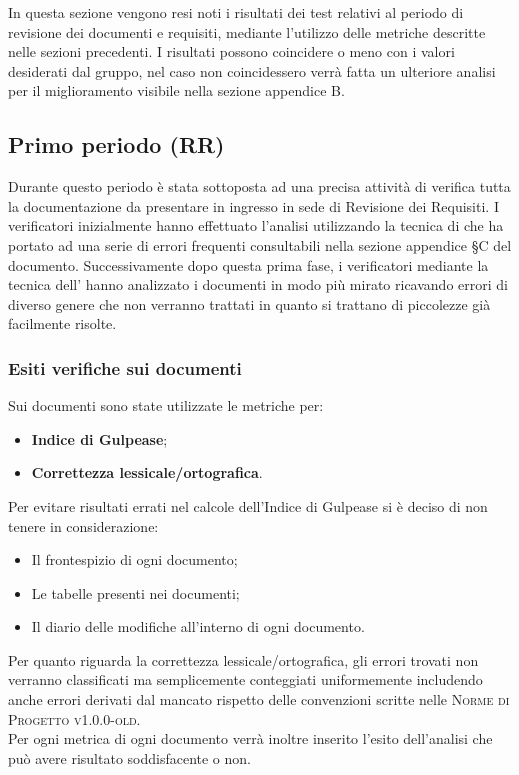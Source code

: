 \documentclass[../piano-di-qualifica.tex]{subfiles}
\begin{document}
In questa sezione vengono resi noti i risultati dei test relativi al periodo di revisione dei documenti e requisiti, mediante l'utilizzo delle metriche descritte nelle sezioni precedenti.
I risultati possono coincidere o meno con i valori desiderati dal gruppo, nel caso non coincidessero verrà fatta un ulteriore analisi per il miglioramento visibile nella sezione appendice B.

\subsection{Primo periodo (RR)}
\label{sub:primo_periodo}
Durante questo periodo è stata sottoposta ad una precisa attività di verifica tutta la documentazione da presentare in ingresso in sede di Revisione dei Requisiti.
I verificatori inizialmente hanno effettuato l'analisi utilizzando la tecnica di  che ha portato ad una serie di errori frequenti consultabili nella sezione appendice §C del documento.
Successivamente dopo questa prima fase, i verificatori mediante la tecnica dell' hanno analizzato i documenti in modo più mirato ricavando errori di diverso genere che non verranno trattati in quanto si trattano di piccolezze già facilmente risolte.

\subsubsection{Esiti verifiche sui documenti}
\label{sub:esiti_verifiche_sui_documenti}
Sui documenti sono state utilizzate le metriche per:
    \begin{itemize}
        \item \textbf{Indice di Gulpease};
        \item \textbf{Correttezza lessicale/ortografica}.
    \end{itemize}
Per evitare risultati errati nel calcole dell'Indice di Gulpease si è deciso di non tenere in considerazione:
    \begin{itemize}
        \item Il frontespizio di ogni documento;
        \item Le tabelle presenti nei documenti;
        \item Il diario delle modifiche all'interno di ogni documento.
    \end{itemize}
Per quanto riguarda la correttezza lessicale/ortografica, gli errori trovati non verranno classificati ma semplicemente conteggiati uniformemente includendo anche errori derivati dal mancato rispetto delle convenzioni scritte nelle \textsc{Norme di Progetto v1.0.0-old}.
\\ Per ogni metrica di ogni documento verrà inoltre inserito l'esito dell'analisi che può avere risultato soddisfacente o non.
\end{document}
